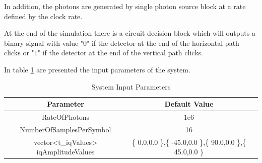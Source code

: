 In addition, the photons are generated by single photon source block at a rate defined by the clock rate.

At the end of the simulation there is a circuit decision block which will outputs a binary signal with value "$0$" \space if the detector at the end of the horizontal path clicks or "$1$" \space if the detector at the end of the vertical path clicks.

In table \ref{tb:inputparameters2} are presented the input parameters of the system.


\begin{table}[H]
\centering
\caption{System Input Parameters}
\label{tb:inputparameters2}
\begin{tabular}{|c|c|c|}
\hline
\textbf{Parameter}                      & \textbf{Default Value}                                       \\ \hline
RateOfPhotons                           & 1e6                                                          \\ \hline
NumberOfSamplesPerSymbol                & 16                                                           \\ \hline
vector<t\_iqValues> iqAmplitudeValues   & \{ 0.0,0.0 \},\{ -45.0,0.0 \},\{ 90.0,0.0 \},\{ 45.0,0.0 \}  \\ \hline

\end{tabular}
\end{table}

